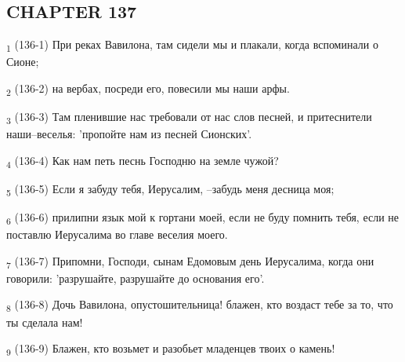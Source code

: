 \subsection{CHAPTER 137}
\begin{tcolorbox}
\textsubscript{1} (136-1) При реках Вавилона, там сидели мы и плакали, когда вспоминали о Сионе;
\end{tcolorbox}
\begin{tcolorbox}
\textsubscript{2} (136-2) на вербах, посреди его, повесили мы наши арфы.
\end{tcolorbox}
\begin{tcolorbox}
\textsubscript{3} (136-3) Там пленившие нас требовали от нас слов песней, и притеснители наши--веселья: 'пропойте нам из песней Сионских'.
\end{tcolorbox}
\begin{tcolorbox}
\textsubscript{4} (136-4) Как нам петь песнь Господню на земле чужой?
\end{tcolorbox}
\begin{tcolorbox}
\textsubscript{5} (136-5) Если я забуду тебя, Иерусалим, --забудь меня десница моя;
\end{tcolorbox}
\begin{tcolorbox}
\textsubscript{6} (136-6) прилипни язык мой к гортани моей, если не буду помнить тебя, если не поставлю Иерусалима во главе веселия моего.
\end{tcolorbox}
\begin{tcolorbox}
\textsubscript{7} (136-7) Припомни, Господи, сынам Едомовым день Иерусалима, когда они говорили: 'разрушайте, разрушайте до основания его'.
\end{tcolorbox}
\begin{tcolorbox}
\textsubscript{8} (136-8) Дочь Вавилона, опустошительница! блажен, кто воздаст тебе за то, что ты сделала нам!
\end{tcolorbox}
\begin{tcolorbox}
\textsubscript{9} (136-9) Блажен, кто возьмет и разобьет младенцев твоих о камень!
\end{tcolorbox}
